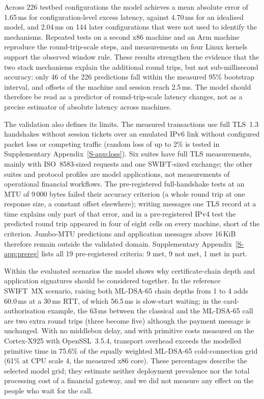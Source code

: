 \documentclass[preprint,12pt]{elsarticle}
\newcommand{\ms}{\,ms\xspace}
\begin{document}
Across 226 testbed configurations the model achieves a mean absolute error of 1.65\ms for configuration-level excess latency, against 4.70\ms for an idealised model, and 2.04\ms on 144 later configurations that were not used to identify the mechanisms. Repeated tests on a second x86 machine and an Arm machine reproduce the round-trip-scale steps, and measurements on four Linux kernels support the observed window rule. These results strengthen the evidence that the two stack mechanisms explain the additional round trips, but not sub-millisecond accuracy: only 46 of the 226 predictions fall within the measured 95\% bootstrap interval, and offsets of the machine and session reach 2.5\ms. The model should therefore be read as a predictor of round-trip-scale latency changes, not as a precise estimator of absolute latency across machines.

The validation also defines its limits. The measured transactions use full TLS~1.3 handshakes without session tickets over an emulated IPv6 link without configured packet loss or competing traffic (random loss of up to 2\% is tested in Supplementary Appendix~\ref{S-app:loss}). Six suites have full TLS measurements, mainly with ISO~8583-sized requests and one SWIFT-sized exchange; the other suites and protocol profiles are model applications, not measurements of operational financial workflows. The pre-registered full-handshake tests at an MTU of 9\,000 bytes failed their accuracy criterion (a whole round trip at one response size, a constant offset elsewhere); writing messages one TLS record at a time explains only part of that error, and in a pre-registered IPv4 test the predicted round trip appeared in four of eight cells on every machine, short of the criterion. Jumbo-MTU predictions and application messages above 16\,KiB therefore remain outside the validated domain. Supplementary Appendix~\ref{S-app:prereg} lists all 19 pre-registered criteria: 9 met, 9 not met, 1 met in part.

Within the evaluated scenarios the model shows why certificate-chain depth and application signatures should be considered together. In the reference SWIFT~MX scenario, raising both ML-DSA-65 chain depths from 1 to 4 adds 60.0\ms at a 30\ms RTT, of which 56.5\ms is slow-start waiting; in the card-authorisation example, the 63\ms between the classical and the ML-DSA-65 call are two extra round trips (three become five) although the payment message is unchanged. With no middlebox delay, and with primitive costs measured on the Cortex-X925 with OpenSSL~3.5.4, transport overhead exceeds the modelled primitive time in 75.6\% of the equally weighted ML-DSA-65 cold-connection grid (61\% at CPU scale 4, the measured x86 core). These percentages describe the selected model grid; they estimate neither deployment prevalence nor the total processing cost of a financial gateway, and we did not measure any effect on the people who wait for the call.
\end{document}
